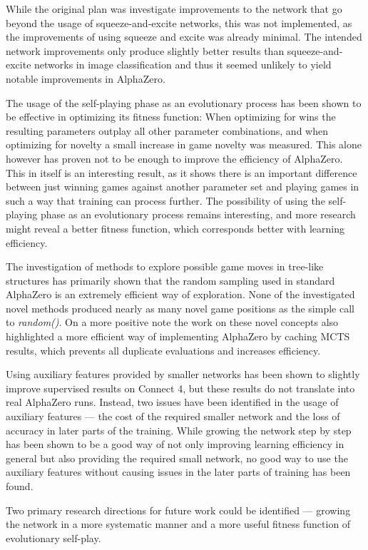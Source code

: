 \documentclass[12pt,onecolumn,oneside,titlepage]{article}
\begin{document}
While the original plan was investigate improvements to the network that go beyond the usage of squeeze-and-excite networks, this was not implemented, as the improvements of using squeeze and excite was already minimal.
The intended network improvements only produce slightly better results than squeeze-and-excite networks in image classification and thus it seemed unlikely to yield notable improvements in AlphaZero.

The usage of the self-playing phase as an evolutionary process has been shown to be effective in optimizing its fitness function: When optimizing for wins the resulting parameters outplay all other parameter combinations,
and when optimizing for novelty a small increase in game novelty was measured. This alone however has proven not to be enough to improve the efficiency of AlphaZero. This in itself is an interesting result, as it shows there is an
important difference between just winning games against another parameter set and playing games in such a way that training can process further. The possibility of using the self-playing phase as an evolutionary process remains
interesting, and more research might reveal a better fitness function, which corresponds better with learning efficiency.

The investigation of methods to explore possible game moves in tree-like structures has primarily shown that the random sampling used in standard AlphaZero is an extremely efficient way of exploration.
None of the investigated novel methods produced nearly as many novel game positions as the simple call to \emph{random()}. On a more positive note the work on these novel concepts also highlighted a more efficient way of implementing AlphaZero by caching MCTS results,
which prevents all duplicate evaluations and increases efficiency.

Using auxiliary features provided by smaller networks has been shown to slightly improve supervised results on Connect 4, but these results do not translate into real AlphaZero runs.
Instead, two issues have been identified in the usage
of auxiliary features --- the cost of the required smaller network and the loss of accuracy
in later parts of the training. While growing the network step by step has been shown to be a good way of not only improving learning efficiency in general but also providing the
required small network, no good way to use the auxiliary features without causing issues in the later parts of training has been found.

Two primary research directions for future work could be identified --- growing the network in a more systematic manner and a more useful fitness function of evolutionary self-play.






\end{document}
